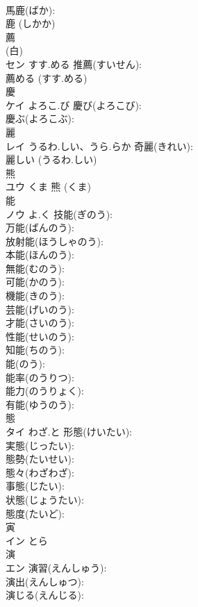 \documentclass[8pt]{extreport}
\begin{document}
\begin{CJK}{UTF8}{min}
\\	馬鹿(ばか): 
\\	鹿 (しかか)
\\	薦			
\\	(白) 
\\	セン	すす.める	推薦(すいせん): 
\\	薦める (すす.める)
\\	慶			
\\	ケイ	よろこ.び	慶び(よろこび): 
\\	慶ぶ(よろこぶ): 
\\	麗			
\\	レイ	うるわ.しい、うら.らか	奇麗(きれい): 
\\	麗しい (うるわ.しい)
\\	熊			
\\	ユウ	くま		熊 (くま)
\\	能			
\\	ノウ	よ.く	技能(ぎのう): 
\\	万能(ばんのう): 
\\	放射能(ほうしゃのう): 
\\	本能(ほんのう): 
\\	無能(むのう): 
\\	可能(かのう): 
\\	機能(きのう): 
\\	芸能(げいのう): 
\\	才能(さいのう): 
\\	性能(せいのう): 
\\	知能(ちのう): 
\\	能(のう): 
\\	能率(のうりつ): 
\\	能力(のうりょく): 
\\	有能(ゆうのう): 
\\	態			
\\	タイ	わざ.と	形態(けいたい): 
\\	実態(じったい): 
\\	態勢(たいせい): 
\\	態々(わざわざ): 
\\	事態(じたい): 
\\	状態(じょうたい): 
\\	態度(たいど): 
\\	寅			
\\	イン	とら		
\\	演			
\\	エン		演習(えんしゅう): 
\\	演出(えんしゅつ): 
\\	演じる(えんじる): 

\end{CJK}
\end{document}
